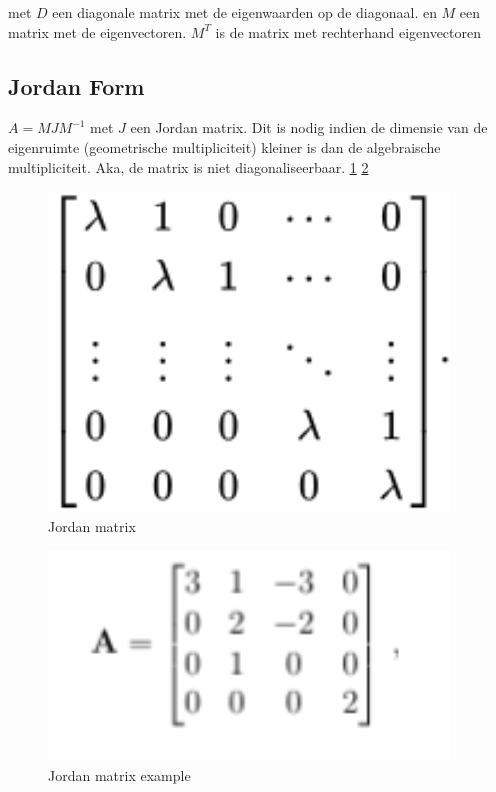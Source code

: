 \documentclass[a4paper]{report}
\begin{document}
met $D$ een diagonale matrix met de eigenwaarden op de diagonaal.
en $M$ een matrix met de eigenvectoren. $M^T$ is de matrix met rechterhand eigenvectoren

\subsection{Jordan Form}

$A = MJM^{-1}$
met $J$ een Jordan matrix.
Dit is nodig indien de dimensie van de eigenruimte (geometrische multipliciteit) kleiner is dan de algebraische multipliciteit.
Aka, de matrix is niet diagonaliseerbaar. \ref{fig:jordan} \ref{fig:jordan_ex}

\begin{figure}[H]
	\begin{center}
		\includegraphics[width=0.95\textwidth]{./images/jordan.png}
	\end{center}
	\caption{Jordan matrix}
	\label{fig:jordan}
\end{figure}

\begin{figure}[H]
	\begin{center}
		\includegraphics[width=0.95\textwidth]{./images/ex_joran.png}
	\end{center}
	\caption{Jordan matrix example}
	\label{fig:jordan_ex}
\end{figure}
\end{document}
